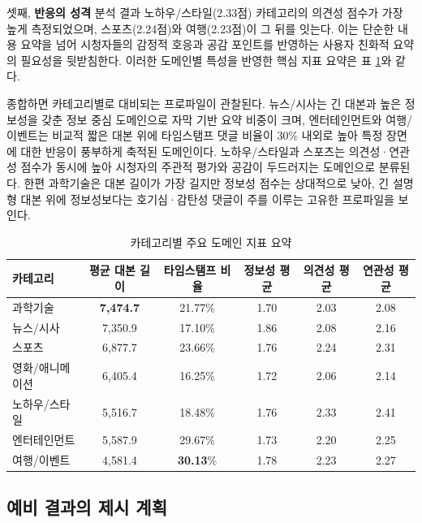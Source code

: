 \documentclass[11pt,a4paper]{article}
\begin{document}
셋째, \textbf{반응의 성격} 분석 결과 노하우/스타일(2.33점) 카테고리의 의견성 점수가 가장 높게 측정되었으며, 스포츠(2.24점)와 여행(2.23점)이 그 뒤를 잇는다. 이는 단순한 내용 요약을 넘어 시청자들의 감정적 호응과 공감 포인트를 반영하는 사용자 친화적 요약의 필요성을 뒷받침한다. 이러한 도메인별 특성을 반영한 핵심 지표 요약은 표 \ref{tab:domain_summary}와 같다.

종합하면 카테고리별로 대비되는 프로파일이 관찰된다. 뉴스/시사는 긴 대본과 높은 정보성을 갖춘 정보 중심 도메인으로 자막 기반 요약 비중이 크며, 엔터테인먼트와 여행/이벤트는 비교적 짧은 대본 위에 타임스탬프 댓글 비율이 30\% 내외로 높아 특정 장면에 대한 반응이 풍부하게 축적된 도메인이다. 노하우/스타일과 스포츠는 의견성·연관성 점수가 동시에 높아 시청자의 주관적 평가와 공감이 두드러지는 도메인으로 분류된다. 한편 과학기술은 대본 길이가 가장 길지만 정보성 점수는 상대적으로 낮아, 긴 설명형 대본 위에 정보성보다는 호기심·감탄성 댓글이 주를 이루는 고유한 프로파일을 보인다.

\begin{table}[htbp]
  \centering
  \caption{카테고리별 주요 도메인 지표 요약}
  \vspace{3mm}
  \begin{tabular}{lccccc}
    \toprule
    \textbf{카테고리} & \textbf{평균 대본 길이} & \textbf{타임스탬프 비율} & \textbf{정보성 평균} & \textbf{의견성 평균} & \textbf{연관성 평균} \\
    \midrule
    과학기술 & \textbf{7,474.7} & 21.77\% & 1.70 & 2.03 & 2.08 \\
    뉴스/시사 & 7,350.9 & 17.10\% & 1.86 & 2.08 & 2.16 \\
    스포츠 & 6,877.7 & 23.66\% & 1.76 & 2.24 & 2.31 \\
    영화/애니메이션 & 6,405.4 & 16.25\% & 1.72 & 2.06 & 2.14 \\
    노하우/스타일 & 5,516.7 & 18.48\% & 1.76 & 2.33 & 2.41 \\
    엔터테인먼트 & 5,587.9 & 29.67\% & 1.73 & 2.20 & 2.25 \\
    여행/이벤트 & 4,581.4 & \textbf{30.13}\% & 1.78 & 2.23 & 2.27 \\
    \bottomrule
  \end{tabular}
  \label{tab:domain_summary}
\end{table}

\subsection{예비 결과의 제시 계획}\label{subsec:prelim}
\end{document}
